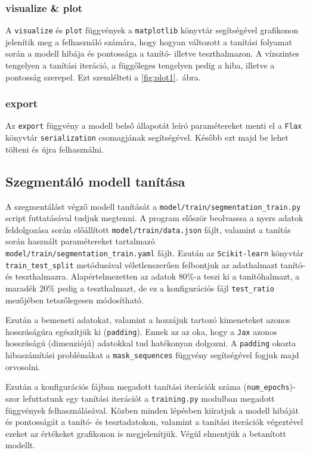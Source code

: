 \subsubsection{visualize \& plot}
A \texttt{visualize} és \texttt{plot} függvények a \texttt{matplotlib}\cite{Hunter:2007} könyvtár
segítségével grafikonon jelenítik meg a felhasználó számára, hogy hogyan változott a tanítási
folyamat során a modell hibája és pontossága a tanító- illetve teszthalmazon.
A vízszintes tengelyen a tanítási iteráció, a függőleges tengelyen pedig a hiba, illetve a pontosság
szerepel. Ezt szemlélteti a \ref{fig:plot1}.~ábra.

\subsubsection{export}
Az \texttt{export} függvény a modell belső állapotát leíró paramétereket menti el
a \texttt{Flax} könyvtár \texttt{serialization} csomagjának segítségével. Később ezt majd
be lehet tölteni és újra felhasználni.

\subsection{Szegmentáló modell tanítása}
A szegmentálást végző modell tanítását a \texttt{model/train/segmentation\_train.py}
script futtatásával tudjuk megtenni. A program először beolvasssa a nyers adatok feldolgozása
során előállított \texttt{model/train/data.json} fájlt, valamint a tanítás során használt paramétereket
tartalmazó \texttt{model/train/segmentation\_train.yaml} fájlt. Ezután az \texttt{Scikit-learn}\cite{scikit-learn}
könyvtár \texttt{train\_test\_split} metódusával véletlenszerűen felbontjuk az adathalmazt
tanító- és teszthalmazra. Alapértelmezetten az adatok $80\%$-a teszi ki a tanítóhalmazt, a maradék
$20\%$ pedig a teszthalmazt, de ez a konfigurációs fájl \texttt{test\_ratio} mezőjében tetszőlegesen módosítható.

Ezután a bemeneti adatokat, valamint a hozzájuk tartozó kimeneteket azonos hosszúságúra egészítjük ki
(\texttt{padding}). Ennek az az oka, hogy a \texttt{Jax} azonos hosszúságú (dimenziójú) adatokkal tud
hatékonyan dolgozni. A \texttt{padding} okozta hibaszámítási problémákat a \texttt{mask\_sequences}
függvény segítségével fogjuk majd orvosolni.

Ezután a konfigurációs fájban megadott tanítási iterációk száma (\texttt{num\_epochs})-szor
lefuttatunk egy tanítási iterációt a \texttt{training.py} modulban megadott függvények felhasználásával.
Közben minden lépésben kiíratjuk a modell hibáját és pontosságát a tanító- és tesztadatokon, valamint
a tanítási iterációk végeztével ezeket az értékeket grafikonon is megjelenítjük. Végül elmentjük
a betanított modellt.

